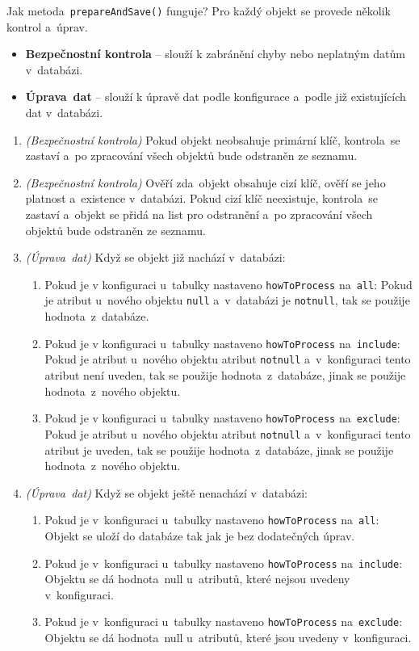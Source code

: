 Jak metoda~\texttt{prepareAndSave()} funguje?
Pro každý objekt se provede několik kontrol a~úprav.

\begin{itemize}
    \item \textbf{Bezpečnostní kontrola} -- slouží k zabránění chyby nebo neplatným datům v~databázi.
    \item \textbf{Úprava~dat} -- slouží k úpravě dat podle konfigurace a~podle již existujících dat v~databázi.
\end{itemize}

\begin{enumerate}
    \item \textit{(Bezpečnostní kontrola)} Pokud objekt neobsahuje primární klíč, kontrola~se zastaví a~po 
    zpracování všech objektů bude odstraněn ze seznamu.
    \item \textit{(Bezpečnostní kontrola)} Ověří zda~objekt obsahuje cizí klíč, ověří se jeho platnost a~existence v~databázi.
    Pokud cizí klíč neexistuje, kontrola~se zastaví a~objekt se přidá na list pro odstranění a~po zpracování všech objektů 
    bude odstraněn ze seznamu.
    \item \textit{(Úprava~dat)} Když se objekt již nachází v~databázi:
    \begin{enumerate}
        \item Pokud je v konfiguraci u~tabulky nastaveno \texttt{howToProcess} na~\texttt{all}:
        Pokud je atribut u~nového objektu \texttt{null} a~v~databázi je \texttt{notnull}, tak se použije hodnota~z~databáze.
        \item Pokud je v konfiguraci u~tabulky nastaveno \texttt{howToProcess} na~\texttt{include}:
        Pokud je atribut u~nového objektu atribut \texttt{notnull} a~v~konfiguraci tento atribut není uveden, tak se použije hodnota~z~databáze,
        jinak se použije hodnota~z~nového objektu.
        \item Pokud je v konfiguraci u~tabulky nastaveno \texttt{howToProcess} na~\texttt{exclude}:
        Pokud je atribut u~nového objektu atribut \texttt{notnull} a~v~konfiguraci tento atribut je uveden, tak se použije hodnota~z~databáze,
        jinak se použije hodnota~z~nového objektu.
    \end{enumerate}

    \item \textit{(Úprava~dat)} Když se objekt ještě nenachází v~databázi:
    \begin{enumerate}
        \item Pokud je v~konfiguraci u~tabulky nastaveno \texttt{howToProcess} na~\texttt{all}:
        Objekt se uloží do databáze tak jak je bez dodatečných úprav.
        \item Pokud je v~konfiguraci u~tabulky nastaveno \texttt{howToProcess} na~\texttt{include}:
        Objektu se dá hodnota~null u~atributů, které nejsou uvedeny v~konfiguraci.
        \item Pokud je v~konfiguraci u~tabulky nastaveno \texttt{howToProcess} na~\texttt{exclude}:
        Objektu se dá hodnota~null u~atributů, které jsou uvedeny v~konfiguraci.
    \end{enumerate}
\end{enumerate}

